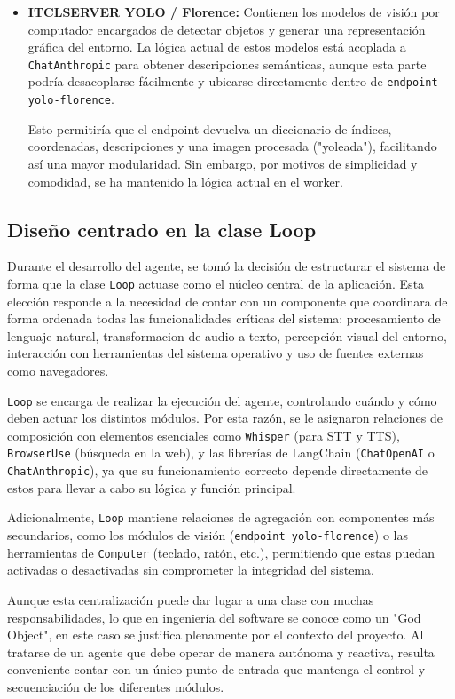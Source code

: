 \begin{itemize}
    \item \textbf{ITCLSERVER YOLO / Florence:} Contienen los modelos de visión por computador encargados de detectar objetos y generar una representación gráfica del entorno. La lógica actual de estos modelos está acoplada a \texttt{ChatAnthropic} para obtener descripciones semánticas, aunque esta parte podría desacoplarse fácilmente y ubicarse directamente dentro de \texttt{endpoint-yolo-florence}.
    
    Esto permitiría que el endpoint devuelva un diccionario de índices, coordenadas, descripciones y una imagen procesada ("yoleada"), facilitando así una mayor modularidad. Sin embargo, por motivos de simplicidad y comodidad, se ha mantenido la lógica actual en el worker.

\end{itemize}

\subsection{Diseño centrado en la clase Loop}
Durante el desarrollo del agente, se tomó la decisión de estructurar el sistema de forma que la clase \texttt{Loop} actuase como el núcleo central de la aplicación. Esta elección responde a la necesidad de contar con un componente que coordinara de forma ordenada todas las funcionalidades críticas del sistema: procesamiento de lenguaje natural, transformacion de audio a texto, percepción visual del entorno, interacción con herramientas del sistema operativo y uso de fuentes externas como navegadores.

\texttt{Loop} se encarga de realizar la ejecución del agente, controlando cuándo y cómo deben actuar los distintos módulos. Por esta razón, se le asignaron relaciones de composición con elementos esenciales como \texttt{Whisper} (para STT y TTS), \texttt{BrowserUse} (búsqueda en la web), y las librerías de LangChain (\texttt{ChatOpenAI} o \texttt{ChatAnthropic}), ya que su funcionamiento correcto depende directamente de estos para llevar a cabo su lógica y función principal.

Adicionalmente, \texttt{Loop} mantiene relaciones de agregación con componentes más secundarios, como los módulos de visión (\texttt{endpoint yolo-florence}) o las herramientas de \texttt{Computer} (teclado, ratón, etc.), permitiendo que estas puedan activadas o desactivadas sin comprometer la integridad del sistema.

Aunque esta centralización puede dar lugar a una clase con muchas responsabilidades, lo que en ingeniería del software se conoce como un "God Object", en este caso se justifica plenamente por el contexto del proyecto. Al tratarse de un agente que debe operar de manera autónoma y reactiva, resulta conveniente contar con un único punto de entrada que mantenga el control y secuenciación de los diferentes módulos.

